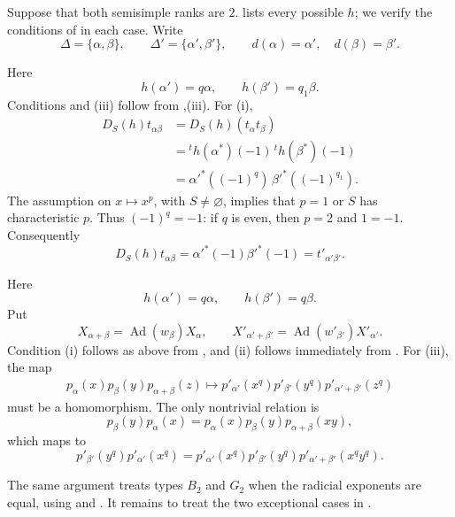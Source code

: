 Suppose that both semisimple ranks are \(2\). 
lists every possible \(h\); we verify the conditions of 
in each case. Write
\[
  \Delta=\{\alpha,\beta\},\qquad
  \Delta'=\{\alpha',\beta'\},\qquad
  d(\alpha)=\alpha',\quad d(\beta)=\beta'.
\]

Here
\[
  h(\alpha')=q\alpha,\qquad h(\beta')=q_1\beta.
\]
Conditions  and (iii) follow from ,(iii).
For (i),
\[
\begin{aligned}
 D_S(h)t_{\alpha\beta}
  &=D_S(h)(t_\alpha t_\beta)\\
  &={}^th(\alpha^*)(-1)\,{}^th(\beta^*)(-1)\\
  &=\alpha'^*((-1)^q)\,\beta'^*((-1)^{q_1}).
\end{aligned}
\]
The assumption on \(x\mapsto x^p\), with \(S\ne\varnothing\), implies
that \(p=1\) or \(S\) has characteristic \(p\). Thus
\((-1)^q=-1\): if \(q\) is even, then \(p=2\) and \(1=-1\).
Consequently
\[
  D_S(h)t_{\alpha\beta}
   =\alpha'^*(-1)\beta'^*(-1)=t'_{\alpha'\beta'}.
\]

Here
\[
  h(\alpha')=q\alpha,\qquad h(\beta')=q\beta.
\]
Put
\[
  X_{\alpha+\beta}=\operatorname{Ad}(w_\beta)X_\alpha,
  \qquad
  X'_{\alpha'+\beta'}=\operatorname{Ad}(w'_{\beta'})X'_{\alpha'}.
\]
Condition (i) follows as above from , and (ii)
follows immediately from . For (iii), the map
\[
\begin{aligned}
 p_\alpha(x)p_\beta(y)p_{\alpha+\beta}(z)
 \longmapsto
 p'_{\alpha'}(x^q)p'_{\beta'}(y^q)p'_{\alpha'+\beta'}(z^q)
\end{aligned}
\]
must be a homomorphism. The only nontrivial relation is
\[
 p_\beta(y)p_\alpha(x)
  =p_\alpha(x)p_\beta(y)p_{\alpha+\beta}(xy),
\]
which maps to
\[
 p'_{\beta'}(y^q)p'_{\alpha'}(x^q)
  =p'_{\alpha'}(x^q)p'_{\beta'}(y^q)
    p'_{\alpha'+\beta'}(x^qy^q).
\]

The same argument treats types \(B_2\) and \(G_2\) when the
radicial exponents are equal, using  and .
It remains to treat the two exceptional cases in .


